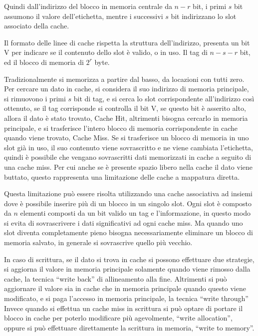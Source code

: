 \documentclass{article}
\numberwithin{equation}{subsection}
\begin{document}
Quindi dall'indirizzo del blocco in memoria centrale da $n-r$ bit, i primi $s$ bit assumono il valore dell'etichetta, mentre i successivi $s$ bit 
indirizzano lo slot associato della cache. 

Il formato delle linee di cache rispetta la struttura dell'indirizzo, presenta un bit V per indicare se il contenuto dello slot è valido, o in uso. Il tag di $n-s-r$ bit, ed 
il blocco di memoria di $2^r$ byte. 

Tradizionalmente si memorizza a partire dal basso, da locazioni con tutti zero. 
Per cercare un dato in cache, si considera il suo indirizzo di memoria principale, si rimuovono i primi $s$ bit di tag, e si cerca lo slot corrispondente all'indirizzo così 
ottenuto, se il tag corrisponde si controlla il bit V, se questo bit è asserito alto, allora il dato è stato trovato, Cache Hit, altrimenti bisogna cercarlo in memoria principale, e 
si trasferisce l'intero blocco di memoria corrispondente in cache quando viene trovato, Cache Miss. 
Se si trasferisce un blocco di memoria in uno slot già in uso, il suo contenuto viene sovrascritto e ne viene cambiata l'etichetta, quindi è possibile che vengano sovrascritti 
dati memorizzati in cache a seguito di una cache miss. 
Per cui anche se è presente spazio libero nella cache il dato viene buttato, questo rappresenta una limitazione delle cache a mappatura diretta. 

Questa limitazione può essere risolta utilizzando una cache associativa ad insiemi dove è possibile inserire più di un blocco in un singolo slot. Ogni slot 
è composto da $n$ elementi composti da un bit valido un tag e l'informazione, in questo modo si evita di sovrascrivere i dati 
significativi ad ogni cache miss. Ma quando uno slot diventa completamente pieno bisogna necessariamente eliminare un blocco di memoria salvato, in generale si sovrascrive 
quello più vecchio. 


In caso di scrittura, se il dato si trova in cache si possono effettuare due strategie, si aggiorna il valore in memoria principale solamente quando viene rimosso dalla cache, 
la tecnica ``write back'' di allineamento alla fine. Altrimenti si può aggiornare il valore sia in cache che in memoria principale quando questo viene modificato, e si paga 
l'accesso in memoria principale, la tecnica ``write through''
Invece quando si effettua un cache miss in scrittura si può optare di portare il blocco in cache per poterlo modificare più agevolmente, ``write allocation'', oppure si 
può effettuare direttamente la scrittura in memoria, ``write to memory''.
\end{document}
